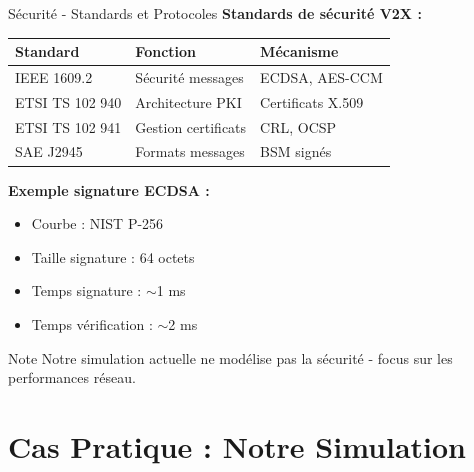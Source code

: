 ﻿\documentclass[aspectratio=169,11pt]{beamer}
\begin{document}
\begin{frame}{S\'ecurit\'e - Standards et Protocoles}
\textbf{Standards de s\'ecurit\'e V2X :}

\begin{table}
\centering
\scriptsize
\begin{tabular}{lll}
\toprule
\textbf{Standard} & \textbf{Fonction} & \textbf{M\'ecanisme} \\
\midrule
IEEE 1609.2 & S\'ecurit\'e messages & ECDSA, AES-CCM \\
ETSI TS 102 940 & Architecture PKI & Certificats X.509 \\
ETSI TS 102 941 & Gestion certificats & CRL, OCSP \\
SAE J2945 & Formats messages & BSM sign\'es \\
\bottomrule
\end{tabular}
\end{table}

\vspace{0.3cm}
\textbf{Exemple signature ECDSA :}
\begin{itemize}
    \item Courbe : NIST P-256
    \item Taille signature : 64 octets
    \item Temps signature : $\sim$1 ms
    \item Temps v\'erification : $\sim$2 ms
\end{itemize}

\begin{alertblock}{Note}
Notre simulation actuelle ne mod\'elise pas la s\'ecurit\'e - focus sur les performances r\'eseau.
\end{alertblock}
\end{frame}

\section{Cas Pratique : Notre Simulation}
\end{document}
